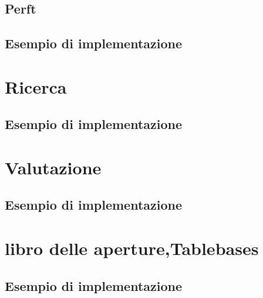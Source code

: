 \subsection{Perft}

\subsection{Esempio di implementazione}


\section{Ricerca} %
\subsection{Esempio di implementazione}

\section{Valutazione} %
\subsection{Esempio di implementazione}

\section{libro delle aperture,Tablebases} %
\subsection{Esempio di implementazione}
